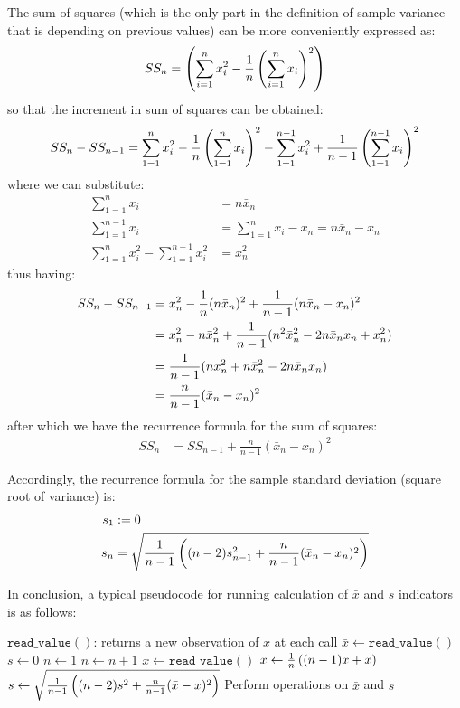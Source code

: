 \documentclass{article}
\begin{document}
The sum of squares (which is the only part in the definition of sample
variance that is depending on previous values) can be more
conveniently expressed as:
\begin{align}
  SS_n = \left(\sum_{i=1}^{n}x_i^2 - \frac{1}{n}\left(\sum_{i=1}^{n} x_i\right)^2\right)
\end{align}
so that the increment in sum of squares can be obtained:
\begin{multline}
  SS_n - SS_{n-1} = \sum_{1=1}^n x_i^2 - \frac{1}{n}\left(\sum_{1=1}^n x_i\right)^2 - \sum_{1=1}^{n-1} x_i^2 + \frac{1}{n-1}\left(\sum_{1=1}^{n-1} x_i\right)^2
\end{multline}
where we can substitute:
\begin{align}
  \sum_{1=1}^n x_i &= n \bar x_n \\
  \sum_{1=1}^{n-1} x_i &= \sum_{1=1}^n x_i - x_n = n \bar x_n - x_n \\
  \sum_{1=1}^{n} x_i^2 - \sum_{1=1}^{n-1} x_i^2 &= x_n^2
\end{align}
thus having:
\begin{align}
  SS_n - SS_{n-1} &= x_n^2 - \frac{1}{n}(n \bar x_n)^2 + \frac{1}{n-1}(n \bar x_n -x_n)^2 \\
  &= x_n^2 - n\bar x_n^2 + \frac{1}{n-1}(n^2 \bar x_n^2 - 2n \bar x_n x_n + x_n^2) \\
  &= \frac{1}{n-1}(n x_n^2 + n \bar x_n^2 - 2 n \bar x_n x_n) \\
  &= \frac{n}{n-1}(\bar x_n - x_n)^2
\end{align}
after which we have the recurrence formula for the sum of squares:
\begin{align}
  SS_n &= SS_{n-1} + \frac{n}{n-1}(\bar x_n - x_n)^2
\end{align}

Accordingly, the recurrence formula for the sample standard deviation
(square root of variance) is:
\begin{align}
  s_1 &:= 0 \\
  s_n &= \sqrt{\frac{1}{n-1} \left( (n-2) s_{n-1}^2 + \frac{n}{n-1}(\bar x_n - x_n)^2 \right)} \label{eq:recursd}
\end{align}

In conclusion, a typical pseudocode for running calculation of
$\bar x$ and $s$ indicators is as follows:

\begin{algorithmic}[1]
  \Require $\mathtt{read\_value}()$: returns a new observation of $x$ at each call
  \State $\bar x \gets \mathtt{read\_value}()$ 
  \State $s \gets 0$
  \State $n \gets 1$
  \Repeat {}
    \State $n \gets n+1$
    \State $x \gets \mathtt{read\_value}()$
    \State $\bar x \gets \frac{1}{n}\left((n-1) \bar x + x\right)$ 
    \State $s \gets \sqrt{\frac{1}{n-1} \left( (n-2) s^2 + \frac{n}{n-1}(\bar x - x)^2\right)}$ 
    \State Perform operations on $\bar x$ and $s$
\end{algorithmic}

\end{document}
